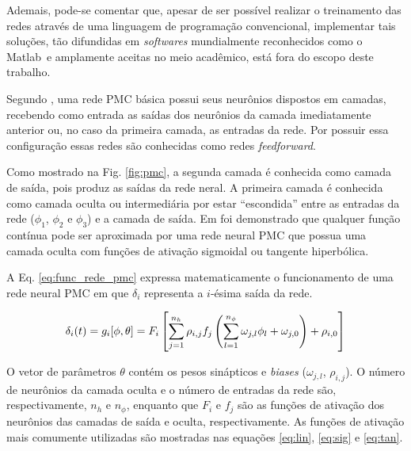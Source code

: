 Ademais, pode-se comentar que, apesar de ser possível realizar o treinamento das
redes através de uma linguagem de programação convencional, implementar tais
soluções, tão difundidas em {\it softwares} mundialmente reconhecidos como o
Matlab\reg\ e amplamente aceitas no meio acadêmico, está fora do escopo deste
trabalho.

Segundo , uma rede PMC básica possui seus neurônios
dispostos em camadas, recebendo como entrada as saídas dos neurônios da camada
imediatamente anterior ou, no caso da primeira camada, as entradas da rede. Por
possuir essa configuração essas redes são conhecidas como redes {\it
feedforward}.

Como mostrado na Fig. \ref{fig:pmc}, a segunda camada é conhecida como camada
de saída, pois produz as saídas da rede neral. A primeira camada é conhecida
como camada oculta ou intermediária por estar ``escondida'' entre as entradas da
rede ($\phi_1$, $\phi_2$ e $\phi_3$) e a camada de saída. Em
 foi demonstrado que qualquer função contínua pode ser
aproximada por uma rede neural PMC que possua uma camada oculta com funções de
ativação sigmoidal ou tangente hiperbólica.

A Eq. \ref{eq:func_rede_pmc} expressa matematicamente o funcionamento de uma
rede neural PMC em que $\delta_i$ representa a $i$-ésima saída da rede.

\begin{equation}\label{eq:func_rede_pmc}
\delta_i(t) = g_i[\phi,\theta] =
              F_i\left[\sum_{j=1}^{n_h}\rho_{i,j}f_j
              \left(\sum_{l=1}^{n_\phi}\omega_{j,l}\phi_l+\omega_{j,0}\right)+
              \rho_{i,0}\right]
\end{equation}

O vetor de parâmetros $\theta$ contém os pesos sinápticos e {\it biases}
($\omega_{j,l}$, $\rho_{i,j}$). O número de neurônios da camada oculta e o
número de entradas da rede são, respectivamente, $n_h$ e $n_\phi$, enquanto que
$F_i$ e $f_j$ são as funções de ativação dos neurônios das camadas de saída e
oculta, respectivamente. As funções de ativação mais comumente utilizadas são
mostradas nas equações \ref{eq:lin}, \ref{eq:sig} e \ref{eq:tan}.

